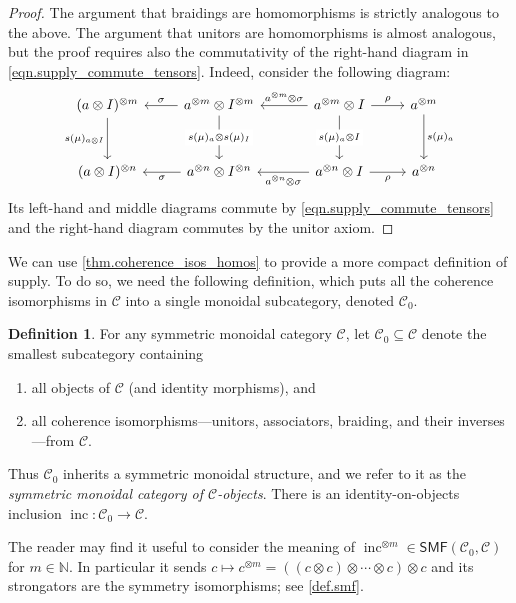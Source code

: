 \documentclass[11pt, oneside, article]{memoir}
\theoremstyle{plain}
\theoremstyle{definition}
\newtheorem{definition}[theorem]{Definition}
\theoremstyle{remark}
\newcommand{\cat}[1]{\mathcal{#1}}%
\newcommand{\Cat}[1]{{\mathsf{#1}}}%
\DeclareMathOperator{\inc}{inc}
\newcommand{\tpow}[1]{^{\otimes #1}}
\newcommand{\smf}{\Cat{SMF}}
\newcommand{\nn}{\mathbb{N}}
\newcommand{\mob}[1]{#1_0}
\renewcommand{\ss}{\subseteq}
\begin{document}
\begin{proof}
The argument that braidings are homomorphisms is strictly analogous to the above. The argument that unitors are homomorphisms is almost analogous, but the proof requires also the commutativity of the right-hand diagram in \cref{eqn.supply_commute_tensors}. Indeed, consider the following diagram:
\[
\begin{tikzcd}[row sep=30pt]
	(a\otimes I)\tpow{m}\ar[d, "s(\mu)_{a\otimes I}"']&
	a\tpow{m}\otimes I\tpow{m}\ar[d, "s(\mu)_a\otimes s(\mu)_I" description]\ar[l, "\sigma"']&[10pt]
	a\tpow{m}\otimes I\ar[d, "s(\mu)_a\otimes I" description]\ar[r, "\rho"]\ar[l, "a\tpow{m}\otimes\sigma"']&
	a\tpow{m}\ar[d, "s(\mu)_a"]\\
	(a\otimes I)\tpow{n}&
	a\tpow{n}\otimes I\tpow{n}\ar[l, "\sigma"]&
	a\tpow{n}\otimes I\ar[l, "a\tpow{n}\otimes\sigma"]\ar[r, "\rho"']&
	a\tpow{n}
\end{tikzcd}
\]
Its left-hand and middle diagrams commute by \cref{eqn.supply_commute_tensors} and the right-hand diagram commutes by the unitor axiom.
\end{proof}

We can use \cref{thm.coherence_isos_homos} to provide a more compact definition of supply. To do so, we need the following definition, which puts all the coherence isomorphisms in $\cat{C}$ into a single monoidal subcategory, denoted $\mob{\cat{C}}$.

\begin{definition}\label{def.mob}
For any symmetric monoidal category $\cat{C}$, let $\mob{\cat{C}}\ss\cat{C}$ denote the smallest subcategory containing
\begin{enumerate}[label=(\roman*)]
	\item all objects of $\cat{C}$ (and identity morphisms), and
	\item all coherence isomorphisms---unitors, associators, braiding, and their inverses---from $\cat{C}$.
\end{enumerate}
Thus $\mob{\cat{C}}$ inherits a symmetric monoidal structure, and we refer to it as the \emph{symmetric monoidal category of $\cat{C}$-objects}. There is an identity-on-objects inclusion $\inc\colon\mob{\cat{C}}\to\cat{C}$. 
\end{definition}

The reader may find it useful to consider the meaning of $\inc\tpow{m}\in\smf(\mob{\cat{C}},\cat{C})$ for $m\in\nn$. In particular it sends $c\mapsto c\tpow{m}=((c\otimes c)\otimes\cdots\otimes c)\otimes c$ and its strongators are the symmetry isomorphisms; see \cref{def.smf}.
\end{document}
